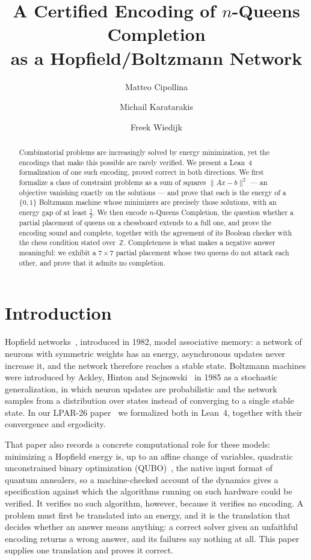 \documentclass{easychair}
\title{A Certified Encoding of $n$-Queens Completion\\ as a Hopfield/Boltzmann Network}
\author{
Matteo Cipollina\inst{1}
\and
Michail Karatarakis\inst{2}
\and
Freek Wiedijk\inst{2}
}
\institute{
  Axiomatic AI, Barcelona, Spain\\
  \email{matteo.cipollina@yahoo.it}
\and
  Radboud University, Nijmegen, The Netherlands\\
  \email{michail.karatarakis@ru.nl, freek@cs.ru.nl}\\
}
\newcommand{\citeref}[1]{\textcolor{academicpurple}{\cite{#1}}}
\begin{document}
\maketitle

\begin{abstract}
Combinatorial problems are increasingly solved by energy minimization, yet the encodings that make
this possible are rarely verified. We present a Lean~4 formalization of one such encoding, proved
correct in both directions. We first formalize a class of constraint problems as a sum of squares
$\lVert Ax-b\rVert^2$ --- an objective vanishing exactly on the solutions --- and prove that each is
the energy of a $\{0,1\}$ Boltzmann machine whose minimizers are precisely those solutions, with an
energy gap of at least $\tfrac12$. We then encode $n$-Queens Completion, the question whether a
partial placement of queens on a chessboard extends to a full one, and prove the encoding sound and
complete, together with the agreement of its Boolean checker with the chess condition stated
over~$\mathbb{Z}$. Completeness is what makes a negative answer meaningful: we exhibit a $7\times7$
partial placement whose two queens do not attack each other, and prove that it admits no completion.
\end{abstract}

\section{Introduction}\label{sec:intro}

Hopfield networks~\citeref{hopfield1982}, introduced in 1982, model associative memory: a network of
neurons with symmetric weights has an energy, asynchronous updates never increase it, and the network
therefore reaches a stable state. Boltzmann machines were introduced by Ackley, Hinton and
Sejnowski~\citeref{ackley1985} in 1985 as a stochastic generalization, in which neuron updates are
probabilistic and the network samples from a distribution over states instead of converging to a
single stable state. In our LPAR-26 paper~\citeref{hnbm} we formalized both in Lean~4, together with
their convergence and ergodicity.

That paper also records a concrete computational role for these models: minimizing a Hopfield energy
is, up to an affine change of variables, quadratic unconstrained binary optimization
(QUBO)~\citeref{lucas2014ising, glover2019}, the native input format of quantum annealers, so a
machine-checked account of the dynamics gives a specification against which the algorithms running on
such hardware could be verified. It verifies no such algorithm, however, because it verifies no
encoding. A problem must first be translated into an energy, and it is the translation that decides
whether an answer means anything: a correct solver given an unfaithful encoding returns a wrong
answer, and its failures say nothing at all. This paper supplies one translation and proves it
correct.
\end{document}

